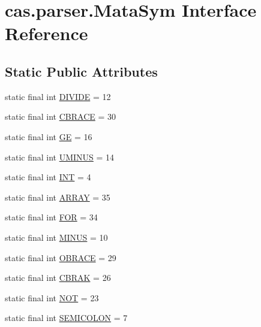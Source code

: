 \hypertarget{interfacecas_1_1parser_1_1_mata_sym}{\section{cas.\-parser.\-Mata\-Sym Interface Reference}
\label{interfacecas_1_1parser_1_1_mata_sym}
}
\subsection*{Static Public Attributes}
\begin{DoxyCompactItemize}
\item 
static final int \hyperlink{interfacecas_1_1parser_1_1_mata_sym_a95a67b4379966a65ed5c5bd04435439b}{D\-I\-V\-I\-D\-E} = 12
\item 
static final int \hyperlink{interfacecas_1_1parser_1_1_mata_sym_aa36f56d17238ef890b41a626d4fce1b7}{C\-B\-R\-A\-C\-E} = 30
\item 
static final int \hyperlink{interfacecas_1_1parser_1_1_mata_sym_af83cdb6b09db6b66c3b8304e26ca629e}{G\-E} = 16
\item 
static final int \hyperlink{interfacecas_1_1parser_1_1_mata_sym_a6e7f410e8093429ba49251e35afe5d0d}{U\-M\-I\-N\-U\-S} = 14
\item 
static final int \hyperlink{interfacecas_1_1parser_1_1_mata_sym_a44a7a9c54909b73bad6cfbf6d889fce4}{I\-N\-T} = 4
\item 
static final int \hyperlink{interfacecas_1_1parser_1_1_mata_sym_ad632041345b49432e2d0c7f3086a07cf}{A\-R\-R\-A\-Y} = 35
\item 
static final int \hyperlink{interfacecas_1_1parser_1_1_mata_sym_a0ab89ede6e01ef974502bcc0c5ce1c0c}{F\-O\-R} = 34
\item 
static final int \hyperlink{interfacecas_1_1parser_1_1_mata_sym_a262c78b7a77be6fe6defceea57afb749}{M\-I\-N\-U\-S} = 10
\item 
static final int \hyperlink{interfacecas_1_1parser_1_1_mata_sym_a927199a043eb40a5189af6b3d872734b}{O\-B\-R\-A\-C\-E} = 29
\item 
static final int \hyperlink{interfacecas_1_1parser_1_1_mata_sym_a93ac3287c1928cd55f130746441f5dde}{C\-B\-R\-A\-K} = 26
\item 
static final int \hyperlink{interfacecas_1_1parser_1_1_mata_sym_a44c2e2dea3383033bed5fb3a995c8d3c}{N\-O\-T} = 23
\item 
static final int \hyperlink{interfacecas_1_1parser_1_1_mata_sym_aa0416979775acaa737e56a5806619df9}{S\-E\-M\-I\-C\-O\-L\-O\-N} = 7

\end{DoxyCompactItemize}
